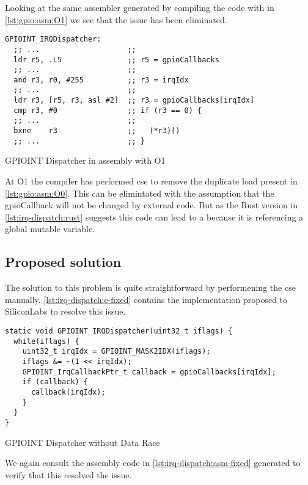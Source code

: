 Looking at the same assembler generated by compiling the code with  in \autoref{lst:gpio:asm:O1} we see that the issue has been eliminated.

\begin{listing}[H]
  \begin{verbatim}
GPIOINT_IRQDispatcher:
  ;; ...                    ;;
  ldr r5, .L5               ;; r5 = gpioCallbacks
  ;; ...                    ;;
  and r3, r0, #255          ;; r3 = irqIdx
  ;; ...                    ;;
  ldr r3, [r5, r3, asl #2]  ;; r3 = gpioCallbacks[irqIdx]
  cmp r3, #0                ;; if (r3 == 0) {
  ;; ...                    ;;
  bxne    r3                ;;   (*r3)()
  ;; ...                    ;; }
  \end{verbatim}
  \caption{GPIOINT Dispatcher in assembly with O1}
  \label{lst:gpio:asm:O1}
\end{listing}

At O1 the compiler has performed \gls{cse} to remove the duplicate load present in \autoref{lst:gpio:asm:O0}.
This can be elimintated with the assumption that the gpioCallback will not be changed by external code.
But as the Rust version in \autoref{lst:irq-dispatch:rust} suggests this code can lead to a  because it is referencing a global mutable variable.

\subsection{Proposed solution}

The solution to this problem is quite straightforward by performening the \gls{cse} manually.
\autoref{lst:irq-dispatch:c-fixed} contains the implementation proposed to SiliconLabs to resolve this issue.

\begin{listing}[H]
  \begin{verbatim}
static void GPIOINT_IRQDispatcher(uint32_t iflags) {
  while(iflags) {
    uint32_t irqIdx = GPIOINT_MASK2IDX(iflags);
    iflags &= ~(1 << irqIdx);
    GPIOINT_IrqCallbackPtr_t callback = gpioCallbacks[irqIdx];
    if (callback) {
      callback(irqIdx);
    }
  }
}
  \end{verbatim}
  \caption{GPIOINT Dispatcher without Data Race}
  \label{lst:irq-dispatch:c-fixed}
\end{listing}

We again consult the assembly code in \autoref{lst:irq-dispatch:asm-fixed} generated to verify that this resolved the issue.

